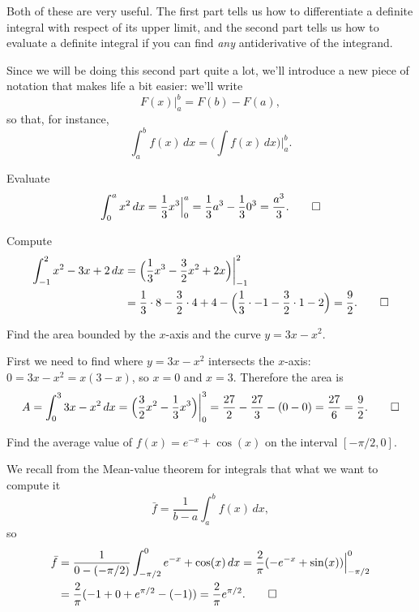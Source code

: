 \noindent
Both of these are very useful.
The first part tells us how to differentiate a definite integral with respect of its upper limit, and the second part tells us how to evaluate a definite integral if you can find \emph{any} antiderivative of the integrand.

Since we will be doing this second part quite a lot, we'll introduce a new piece of notation that makes life a bit easier: we'll write
\[
	F(x) \Big \rvert_a^b = F(b) - F(a),
\]
so that, for instance,
\[
	\int_a^b f(x) \, d x = \Big ( \int f(x) \, d x \Big ) \biggr \rvert_a^b.
\]

\begin{example}
	Evaluate
	\[
		\int_0^a x^2 \, d x = \frac{1}{3} x^3 \Big \rvert_0^a = \frac{1}{3} a^3 - \frac{1}{3} 0^3 = \frac{a^3}{3}. \qedhere
	\]
\end{example}

\begin{example}
	Compute
	\begin{align*}
		\int_{-1}^2 x^2 - 3 x + 2 \, d x & = \Big ( \frac{1}{3} x^3 - \frac{3}{2} x^2 + 2 x \Big ) \biggr \rvert_{-1}^2                                                           \\
		                                 & = \frac{1}{3} \cdot 8 - \frac{3}{2} \cdot 4 + 4 - \Big ( \frac{1}{3} \cdot -1 - \frac{3}{2} \cdot 1 - 2 \Big ) = \frac{9}{2}. \qedhere
	\end{align*}
\end{example}

\begin{example}
	Find the area bounded by the $x$-axis and the curve $y = 3x - x^2$.

	First we need to find where $y = 3x - x^2$ intersects the $x$-axis: $0 = 3 x - x^2 = x (3 - x)$, so $x = 0$ and $x = 3$.
	Therefore the area is
	\[
		A = \int_0^3 3 x - x^2 \, d x = \Big ( \frac{3}{2} x^2 - \frac{1}{3} x^3 \Big ) \biggr \rvert_0^3 = \frac{27}{2} - \frac{27}{3} - (0 - 0) = \frac{27}{6} = \frac{9}{2}. \qedhere
	\]
\end{example}

\begin{example}
	Find the average value of $f(x) = e^{-x} + \cos(x)$ on the interval $[{-\pi/2}, 0]$.

	We recall from the Mean-value theorem for integrals that what we want to compute it
	\[
		\bar{f} = \frac{1}{b - a} \int_a^b f(x) \, d x,
	\]
	so
	\begin{align*}
		\bar{f} & = \frac{1}{0 - (- \pi/2)} \int_{-\pi/2}^0 e^{-x} + \cos(x) \, d x = \frac{2}{\pi} (-e^{-x} + \sin(x)) \Big \rvert_{-\pi/2}^0 \\
		        & = \frac{2}{\pi} (-1 + 0 + e^{\pi/2} - (-1)) = \frac{2}{\pi} e^{\pi/2}. \qedhere
	\end{align*}
\end{example}

